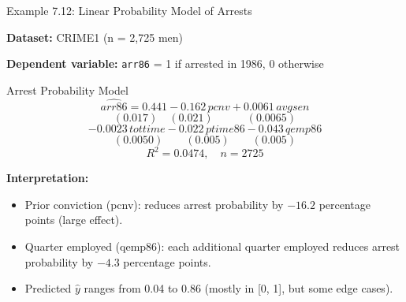 \documentclass[aspectratio=169, 12pt]{beamer}
\begin{document}
\begin{frame}[shrink=30]{Example 7.12: Linear Probability Model of Arrests}

  \textbf{Dataset:} CRIME1 (n = 2,725 men)

  \textbf{Dependent variable:} \texttt{arr86} = 1 if arrested in 1986, 0 otherwise

  \medskip

  \begin{examplebox}{Arrest Probability Model}
    \[
      \widehat{\textit{arr86}} = 0.441 - 0.162 \, \textit{pcnv} + 0.0061 \, \textit{avgsen}
    \]
    \[
      (0.017) \quad (0.021) \quad\quad\quad (0.0065)
    \]
    \[
      - 0.0023 \, \textit{tottime} - 0.022 \, \textit{ptime86} - 0.043 \, \textit{qemp86}
    \]
    \[
      (0.0050) \quad\quad (0.005) \quad\quad (0.005)
    \]
    \[
      R^2 = 0.0474, \quad n = 2725
    \]
  \end{examplebox}

  \medskip

  \textbf{Interpretation:}

  \begin{keybox}
    \begin{itemize}
      \item Prior conviction (pcnv): reduces arrest probability by $-16.2$ percentage points (large effect).
      \item Quarter employed (qemp86): each additional quarter employed reduces arrest probability by $-4.3$ percentage points.
      \item Predicted $\hat{y}$ ranges from 0.04 to 0.86 (mostly in [0, 1], but some edge cases).
    \end{itemize}
  \end{keybox}

\end{frame}
\end{document}
